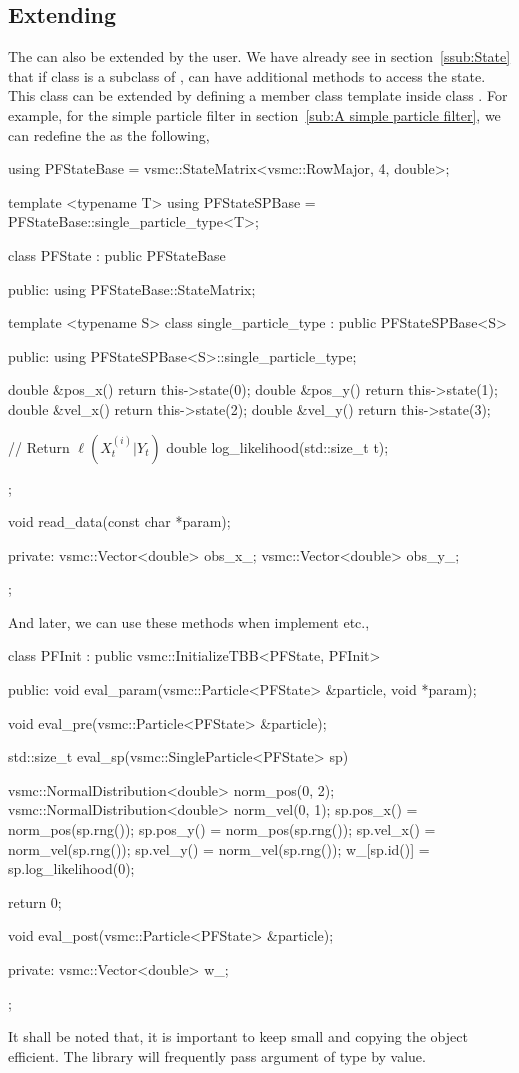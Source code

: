 \subsection{Extending \protect\spt}
\label{sub:Extending SPT}

The  can also be extended by the user. We have
already see in section~\ref{ssub:State} that if class  is a
subclass of ,  can have
additional methods to access the state. This class can be extended by defining
a member class template inside class . For example, for the simple
particle filter in section~\ref{sub:A simple particle filter}, we can redefine
the  as the following,
\begin{cppcode}
  using PFStateBase = vsmc::StateMatrix<vsmc::RowMajor, 4, double>;
  
  template <typename T>
  using PFStateSPBase = PFStateBase::single_particle_type<T>;
  
  class PFState : public PFStateBase
  {
      public:
      using PFStateBase::StateMatrix;
  
      template <typename S>
      class single_particle_type : public PFStateSPBase<S>
      {
          public:
          using PFStateSPBase<S>::single_particle_type;
  
          double &pos_x() { return this->state(0); }
          double &pos_y() { return this->state(1); }
          double &vel_x() { return this->state(2); }
          double &vel_y() { return this->state(3); }
  
          // Return $\ell(X_t^{(i)}|Y_t)$
          double log_likelihood(std::size_t t);
      };
  
      void read_data(const char *param);
  
      private:
      vsmc::Vector<double> obs_x_;
      vsmc::Vector<double> obs_y_;
  };
\end{cppcode}
And later, we can use these methods when implement  etc.,
\begin{cppcode}
  class PFInit : public vsmc::InitializeTBB<PFState, PFInit>
  {
      public:
      void eval_param(vsmc::Particle<PFState> &particle, void *param);

      void eval_pre(vsmc::Particle<PFState> &particle);
  
      std::size_t eval_sp(vsmc::SingleParticle<PFState> sp)
      {
          vsmc::NormalDistribution<double> norm_pos(0, 2);
          vsmc::NormalDistribution<double> norm_vel(0, 1);
          sp.pos_x() = norm_pos(sp.rng());
          sp.pos_y() = norm_pos(sp.rng());
          sp.vel_x() = norm_vel(sp.rng());
          sp.vel_y() = norm_vel(sp.rng());
          w_[sp.id()] = sp.log_likelihood(0);
  
          return 0;
      }
  
      void eval_post(vsmc::Particle<PFState> &particle);
  
      private:
      vsmc::Vector<double> w_;
  };
\end{cppcode}
It shall be noted that, it is important to keep
 small and copying the object efficient. The
library will frequently pass argument of  type by
value.
